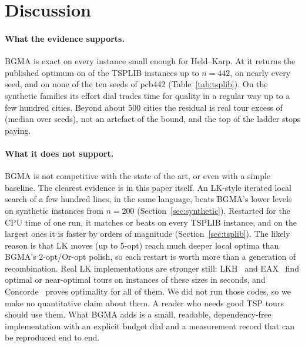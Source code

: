 \section{Discussion}\label{sec:discussion}

\paragraph{What the evidence supports.}
BGMA is exact on every instance small enough for Held--Karp. At  it returns the published
optimum on  of the  TSPLIB instances up to $n=442$, on nearly
every seed, and on none of the ten seeds of pcb442 (Table~\ref{tab:tsplib}). On the synthetic families its effort dial trades time for quality in a
regular way up to a few hundred cities. Beyond about 500 cities the residual is real tour excess of
 (median over seeds), not an artefact of the bound, and the top of the ladder stops paying.

\paragraph{What it does not support.}
BGMA is not competitive with the state of the art, or even with a simple baseline. The clearest
evidence is in this paper itself. An LK-style iterated local search of a few hundred lines, in the same
language, beats BGMA's lower levels on synthetic instances from $n=200$ (Section~\ref{sec:synthetic}).
Restarted for the CPU time of one  run, it matches or beats  on every TSPLIB
instance, and on the largest ones it is faster by orders of magnitude (Section~\ref{sec:tsplib}). The
likely reason is that LK moves (up to 5-opt) reach much deeper local optima than BGMA's 2-opt/Or-opt
polish, so each restart is worth more than a generation of recombination. Real LK implementations are stronger
still: LKH~\citep{helsgaun2009} and EAX~\citep{nagata2013} find optimal or near-optimal tours on
instances of these sizes in seconds, and Concorde~\citep{applegate2006} proves optimality for all of
them. We did not run those codes, so we make no quantitative claim about them. A reader who needs good
TSP tours should use them. What BGMA adds is a small, readable, dependency-free implementation with
an explicit budget dial and a measurement record that can be reproduced end to end.


